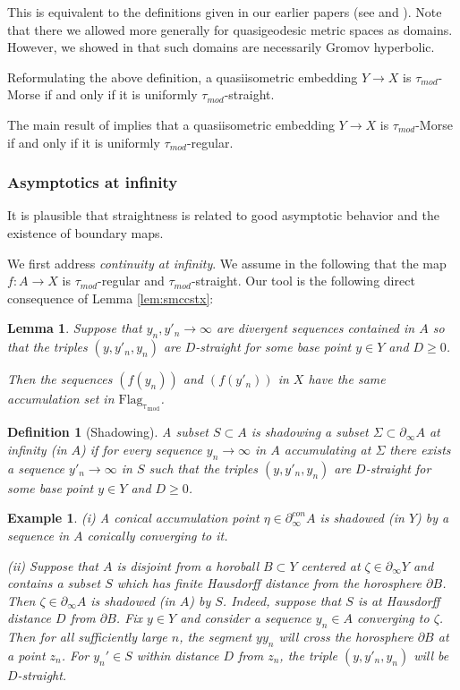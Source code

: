 \documentclass[12pt]{article}
\theoremstyle{boldplain}
\newtheorem{lem}[equation]{Lemma}
\theoremstyle{bolddefinition}
\newtheorem{dfn}[equation]{Definition}
\newtheorem{exa}[equation]{Example}
\numberwithin{equation}{section}
\def\Si{\Sigma}
\def\D{\partial}
\def\Flagt{\operatorname{Flag_{\tau_{mod}}}}
\def\geo{\partial_{\infty}}
\def\geoc{\partial_{\infty}^{con}}
\def\taumod{\tau_{mod}}
\begin{document}
This is equivalent to the definitions given in our earlier papers (see \cite[Def.~7.23]{morse} and \cite[Def.~5.29]{mlem}).
Note that there we allowed more generally for quasigeodesic metric spaces as domains.
However, we showed in \cite[Thm.~6.13]{mlem} that such domains are necessarily Gromov hyperbolic.

Reformulating the above definition,
a quasiisometric embedding $Y\to X$ 
is $\taumod$-Morse if and only if it is uniformly $\taumod$-straight.

The main result of \cite{mlem} implies that 
a quasiisometric embedding $Y\to X$ 
is $\taumod$-Morse if and only if it is uniformly $\taumod$-regular.


\subsubsection{Asymptotics at infinity}
\label{sec:frstrbd}

It is plausible that straightness is related to good asymptotic behavior and the existence of boundary maps.

We first address {\em continuity at infinity}. 
We assume in the following that the map $f:A\to X$ is $\taumod$-regular and $\taumod$-straight.
Our tool is the following direct consequence of Lemma \ref{lem:smccstx}:
\begin{lem}
\label{lem:smccst1}
Suppose that $y_n, y'_n\to\infty$ are divergent sequences contained in $A$ 
so that the triples $(y,y'_n,y_n)$ are $D$-straight for some base point $y\in Y$ and $D\geq0$.

Then the sequences $(f(y_n))$ and $(f(y'_n))$ in $X$ have the same accumulation set in $\Flagt$.
\end{lem}

\begin{dfn}[Shadowing]
A subset $S\subset A$ is {\em shadowing} a subset $\Si\subset\geo A$ at infinity 
(in $A$)
if for every sequence $y_n\to\infty$ in $A$ accumulating at $\Si$ 
there exists
a sequence $y'_n\to\infty$ in $S$
such that the triples $(y,y'_n,y_n)$ are $D$-straight for some base point $y\in Y$ and $D\geq0$.
\end{dfn}


\begin{exa}
(i) A conical accumulation point $\eta\in\geoc A$ is shadowed (in $Y$) by a sequence in $A$ conically converging to it.


(ii) 
Suppose that $A$ is disjoint from a horoball $B\subset Y$ centered at $\zeta\in\geo Y$
and contains a subset $S$ 
which has finite Hausdorff distance from the horosphere $\D B$.
Then $\zeta\in\geo A$ is shadowed (in $A$) by $S$. {Indeed, suppose that $S$ is at Hausdorff distance $D$ from $\D B$. 
Fix $y\in Y$ and consider a sequence $y_n\in A$ converging to $\zeta$. Then for all sufficiently large $n$, the segment 
$yy_n$ will cross the horosphere $\D B$ at a point $z_n$. For $y_n'\in S$ within distance $D$ from $z_n$, the triple $(y, y'_n, y_n)$ will be $D$-straight.}  
\end{exa}
\end{document}
